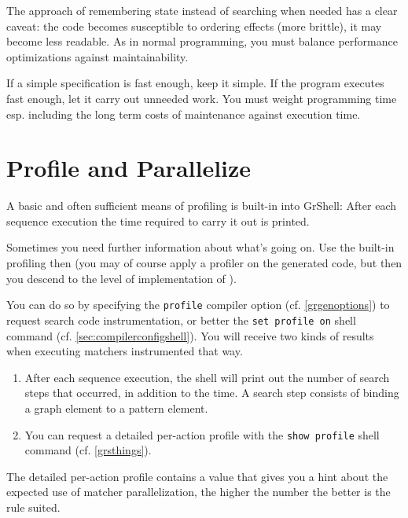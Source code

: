 The approach of remembering state instead of searching when needed has a clear caveat: the code becomes susceptible to ordering effects (more brittle), it may become less readable. 
As in normal programming, you must balance performance optimizations against maintainability.

\begin{note}
If a simple specification is fast enough, keep it simple.
If the program executes fast enough, let it carry out unneeded work.
You must weight programming time esp. including the long term costs of maintenance against execution time.
\end{note}

\section{Profile and Parallelize}\label{sec:performanceparallel}

A basic and often sufficient means of profiling is built-in into GrShell:
After each sequence execution the time required to carry it out is printed.

Sometimes you need further information about what's going on.
Use the built-in profiling then (you may of course apply a profiler on the generated code, but then you descend to the level of implementation of \GrG).

You can do so by specifying the \texttt{profile} compiler option (cf. \ref{grgenoptions}) to request search code instrumentation, or better the \texttt{set profile on} shell command (cf. \ref{sec:compilerconfigshell}).
You will receive two kinds of results when executing matchers instrumented that way.

\begin{enumerate}
	\item After each sequence execution, the shell will print out the number of search steps that occurred, in addition to the time. A search step consists of binding a graph element to a pattern element.
	\item You can request a detailed per-action profile with the \texttt{show profile} shell command (cf. \ref{grsthings}).
\end{enumerate}

The detailed per-action profile contains a value that gives you a hint about the expected use of matcher parallelization, the higher the number the better is the rule suited.

